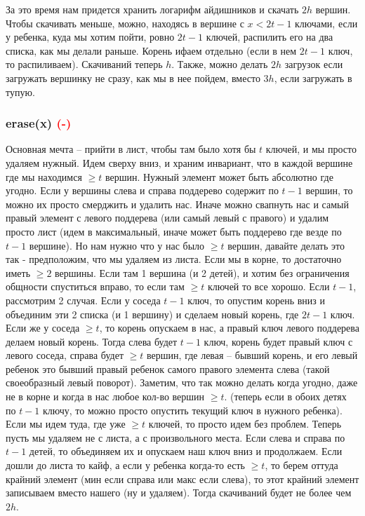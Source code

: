 За это время нам придется хранить логарифм айдишников и скачать $2h$ вершин. Чтобы скачивать меньше, можно, находясь в вершине с $x < 2t - 1$ ключами, если у ребенка, куда мы хотим пойти, ровно $2t - 1$ ключей, распилить его на два списка, как мы делали раньше. Корень ифаем отдельно (если в нем $2t-1$ ключ, то распиливаем). Скачиваний теперь $h$. Также, можно делать $2h$ загрузок если загружать вершинку не сразу, как мы в нее пойдем, вместо $3h$, если загружать в тупую.

\subsubsection{erase(x) \textcolor{red}{(-)}}




Основная мечта -- прийти в лист, чтобы там было хотя бы $t$ ключей, и мы просто удаляем нужный.
Идем сверху вниз, и храним инвариант, что в каждой вершине где мы находимся $\geq t$ вершин. Нужный элемент может быть абсолютно где угодно. Если у вершины слева и справа поддерево содержит по $t-1$ вершин, то можно их просто смерджить и удалить нас. Иначе можно свапнуть нас и самый правый элемент с левого поддерева (или самый левый с правого) и удалим просто лист (идем в максимальный, иначе может быть поддерево где везде по $t-1$ вершине). Но нам нужно что у нас было $\geq t$ вершин, давайте делать это так - предположим, что мы удаляем из листа. Если мы в корне, то достаточно иметь $\geq 2$ вершины. Если там 1 вершина (и 2 детей), и хотим без ограничения общности спуститься вправо, то если там $\geq t$ ключей то все хорошо. Если $t-1$, рассмотрим 2 случая. Если у соседа $t-1$ ключ, то опустим корень вниз и объединим эти 2 списка (и 1 вершину) и сделаем новый корень, где $2t-1$ ключ. Если же у соседа $\geq t$, то корень опускаем в нас, а правый ключ левого поддерева делаем новый корень. Тогда слева будет $t-1$ ключ, корень будет правый ключ с левого соседа, справа будет $\geq t$ вершин, где левая -- бывший корень, и его левый ребенок это бывший правый ребенок самого правого элемента слева (такой своеобразный левый поворот). Заметим, что так можно делать когда угодно, даже не в корне и когда в нас любое кол-во вершин $\geq t$. (теперь если в обоих детях по $t-1$ ключу, то можно просто опустить текущий ключ в нужного ребенка). Если мы идем туда, где уже $\geq t$ ключей, то просто идем без проблем. Теперь пусть мы удаляем не с листа, а с произвольного места. Если слева и справа по $t-1$ детей, то объединяем их и опускаем наш ключ вниз и продолжаем. Если дошли до листа то кайф, а если у ребенка когда-то есть $\geq t$, то берем оттуда крайний элемент (мин если справа или макс если слева), то этот крайний элемент записываем вместо нашего (ну и удаляем). Тогда скачиваний будет не более чем $2h$.




